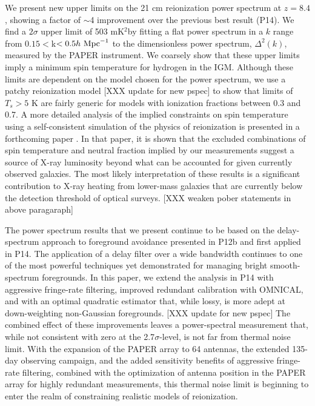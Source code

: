\documentclass[twocolumn,numberedappendix]{emulateapj} \shorttitle{PSA64}
\newcommand{\hMpci}{h\ {\rm Mpc}^{-1}}
\newcommand{\mKsqlimit}{503 mK$^2$}
\begin{document}
We present new upper limits on the 21 cm reionization power spectrum at $z=8.4$,
showing a factor of $\sim$4 improvement over the previous best result (P14).
We find a $2\sigma$ upper limit of \mKsqlimit by fitting a
flat power spectrum in a $k$ range from $0.15<$k$<0.5\hMpci$ to the
dimensionless power spectrum, $\Delta^{2}(k)$, measured by the PAPER instrument. 
We coarsely show that these upper limits imply a minimum spin
temperature for hydrogen in the IGM.  Although these limits are dependent on
the model chosen for the power spectrum, we use a patchy reionization model
[XXX update for new pspec]
to show that limits of $T_s>5$ K are fairly generic for models with
ionization fractions between 0.3 and 0.7.
A more detailed analysis of the implied constraints on spin temperature using
a self-consistent simulation of the physics of reionization is
presented in a forthcoming paper \citep{pober_et_al2015}.  In that paper,
it is shown that the excluded combinations of spin temperature
and neutral fraction implied by our measurements
suggest a source of X-ray luminosity beyond what can be 
accounted for given currently observed galaxies.  The most likely interpretation
of these results is a significant contribution to X-ray heating from lower-mass
galaxies that are currently below the detection threshold of optical surveys.
[XXX weaken pober statements in above paragaraph]

The power spectrum results that we present continue to be based on
the delay-spectrum approach to foreground avoidance presented in 
P12b and first applied in P14.  The application of a delay filter over
a wide bandwidth continues to one of the most powerful techniques yet
demonstrated for managing bright smooth-spectrum foregrounds.  In this
paper, we extend the analysis in P14 with aggressive fringe-rate filtering,
improved redundant calibration with OMNICAL, and with an optimal quadratic
estimator that, while lossy, is more adept at down-weighting non-Gaussian foregrounds.
[XXX update for new pspec]
The combined effect of these improvements leaves a power-spectral measurement that,
while not consistent with zero at the 2.7$\sigma$-level, is not far from thermal
noise limit.  With the expansion of the PAPER array to 64 antennas, the extended 135-day
observing campaign,
and the added sensitivity benefits of aggressive fringe-rate filtering, combined with
the optimization of antenna position in the PAPER array for highly redundant
measurements, this thermal
noise limit is beginning to enter the realm of constraining realistic models of reionization.
\end{document}
